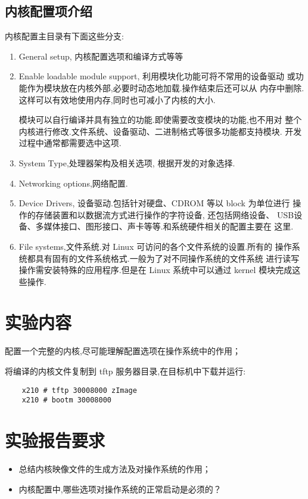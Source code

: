 \subsection{内核配置项介绍}
	内核配置主目录有下面这些分支:
\begin{enumerate}\itemsep=-3pt
  \item General setup, 内核配置选项和编译方式等等
  \item Enable loadable module support, 利用模块化功能可将不常用的设备驱动
		或功能作为模块放在内核外部,必要时动态地加载.操作结束后还可以从
		内存中删除.这样可以有效地使用内存,同时也可减小了内核的大小.

		模块可以自行编译并具有独立的功能.即使需要改变模块的功能,也不用对
		整个内核进行修改.文件系统、设备驱动、二进制格式等很多功能都支持模块.
		开发过程中通常都需要选中这项.
  \item System Type,处理器架构及相关选项, 根据开发的对象选择.
  \item Networking options,网络配置.
  \item Device Drivers, 设备驱动.包括针对硬盘、CDROM 等以 block 为单位进行
		操作的存储装置和以数据流方式进行操作的字符设备, 还包括网络设备、
		USB设备、多媒体接口、图形接口、声卡等等.和系统硬件相关的配置主要在
		这里.
  \item File systems,文件系统.对 Linux 可访问的各个文件系统的设置.所有的
		操作系统都具有固有的文件系统格式.一般为了对不同操作系统的文件系统
		进行读写操作需安装特殊的应用程序.但是在 Linux 系统中可以通过
		kernel 模块完成这些操作.
\end{enumerate}

\section{实验内容}
	配置一个完整的内核,尽可能理解配置选项在操作系统中的作用；

	将编译的内核文件复制到 tftp 服务器目录,在目标机中下载并运行:

\begin{boxedminipage}{.9\textwidth}
\begin{verbatim}
	x210 # tftp 30008000 zImage
	x210 # bootm 30008000
\end{verbatim}
\end{boxedminipage}

\section{实验报告要求}
\begin{itemize}\itemsep=-3pt
  \item 总结内核映像文件的生成方法及对操作系统的作用；
  \item 内核配置中,哪些选项对操作系统的正常启动是必须的？
\end{itemize}
